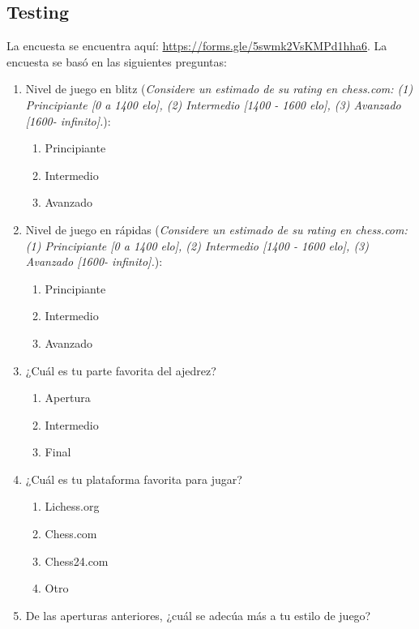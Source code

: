 \subsection{Testing}
La encuesta se encuentra aquí: \textcolor{blue}{\href{https://forms.gle/5swmk2VsKMPd1hha6}{https://forms.gle/5swmk2VsKMPd1hha6}}.\newline\newline
La encuesta se basó en las siguientes preguntas: 
\begin{enumerate}
    \item Nivel de juego en blitz  (\textit{Considere un estimado de su rating en chess.com: (1) Principiante [0 a 1400 elo], (2) Intermedio [1400 - 1600 elo], (3) Avanzado [1600- infinito].}): 
    \begin{enumerate}
        \item Principiante 
        \item Intermedio 
        \item Avanzado
    \end{enumerate}
    \item Nivel de juego en rápidas (\textit{Considere un estimado de su rating en chess.com: (1) Principiante [0 a 1400 elo], (2) Intermedio [1400 - 1600 elo], (3) Avanzado [1600- infinito].}): 
    \begin{enumerate}
        \item Principiante 
        \item Intermedio 
        \item Avanzado
    \end{enumerate}
    \item ¿Cuál es tu parte favorita del ajedrez?
    \begin{enumerate}
        \item Apertura 
        \item Intermedio 
        \item Final
    \end{enumerate}
    \item ¿Cuál es tu plataforma favorita para jugar?
    \begin{enumerate}
        \item Lichess.org
        \item Chess.com
        \item Chess24.com
        \item Otro
    \end{enumerate}
    \item De las aperturas anteriores, ¿cuál se adecúa más a tu estilo de juego? 

\end{enumerate}
